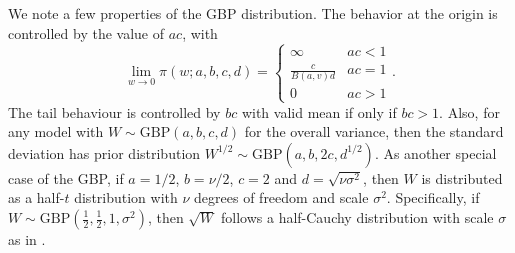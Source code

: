 \documentclass[12pt]{article}
\begin{document}
We note a few properties of the GBP distribution. The behavior at the origin is controlled by the value of $ac$, with
$$
    \lim_{w\rightarrow 0}\pi(w;a,b,c,d) =
    \begin{cases}
      \infty & ac < 1\\
      \frac{c}{B(a,v)d} & ac=1\\
      0 & ac > 1
    \end{cases}.
$$
The tail behaviour is controlled by $bc$ with valid mean if only if $bc>1$.  Also, for any model with $W\sim\mbox{GBP}(a,b,c,d)$ for the overall variance, then the standard deviation has prior distribution $W^{1/2}\sim\mbox{GBP}(a,b,2c,d^{1/2})$. As another special case of the GBP, if $a=1/2$, $b=\nu/2$, $c=2$ and $d=\sqrt{\nu\sigma^2}$, then $W$ is distributed as a half-$t$ distribution with $\nu$ degrees of freedom and scale $\sigma^2$. Specifically, if $W\sim\mbox{GBP}(\frac12,\frac12, 1, \sigma^2)$, then $\sqrt{W}$ follows a half-Cauchy distribution with scale $\sigma$ as in \cite{Gelman2006::cauchy}.

\end{document}
